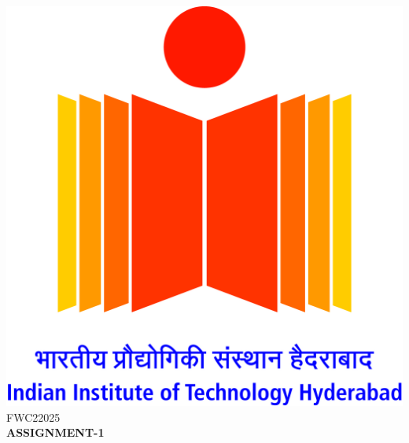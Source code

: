 \documentclass[a4paper,12pt]{report}
\begin{document}
\raggedright{\includegraphics[scale=0.07]{logo.jpg}}\hspace{12.425cm}\raggedleft FWC22025\vspace{2mm}
\\
\centering\Large\textbf{ASSIGNMENT-1}\vspace{5mm}
\end{document}
